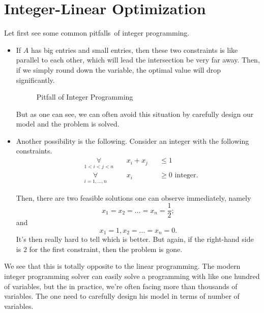 \section{Integer-Linear Optimization}
Let first see some common pitfalls of integer programming.

\begin{itemize}
	\item If \(A \) has big entries and small entries, then these two constraints is like parallel to each other,
	      which will lead the intersection be very far away. Then, if we simply round down the variable, the optimal value will drop significantly.
	      \begin{figure}[H]
		      \centering
		      \caption{Pitfall of Integer Programming}
		      \label{fig:integer-programming-pitfall}
	      \end{figure}

	      But as one can see, we can often avoid this situation by carefully design our model and the problem is solved.
	\item Another possibility is the following. Consider an integer with the following constraints.
	      \[
		      \begin{alignedat}{3}
			      & \underset{1 < i < j < n}{\forall}\      &  & x_{i}+x_{j} &  & \leq 1                  \\
			      & \underset{i = 1, \ldots , n}{\forall}\  &  & x_{i}       &  & \geq 0 \text{ integer}.
		      \end{alignedat}
	      \]

	      Then, there are two feasible solutions one can observe immediately, namely
	      \[
		      x_1 = x_2 = \ldots = x_{n} = \frac{1}{2};
	      \]
	      and
	      \[
		      x_1 = 1, x_2 = \ldots = x_{n} = 0.
	      \]
	      It's then really hard to tell which is better. But again, if the right-hand side is \(2\) for the first constraint, then the problem
	      is gone.
\end{itemize}

\begin{note}
	We see that this is totally opposite to the linear programming. The modern integer programming solver can easily solve a programming with
	like one hundred of variables, but the in practice, we're often facing more than thousands of variables. The one need to carefully design
	his model in terms of number of variables.
\end{note}

